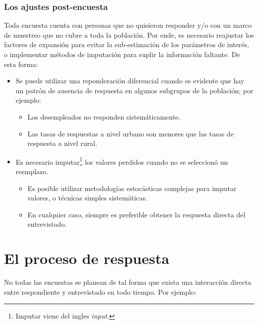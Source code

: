 \documentclass[
  10pt,
  spanish,
]{book}
\providecommand{\tightlist}{%
  \setlength{\itemsep}{0pt}\setlength{\parskip}{0pt}}
\begin{document}
\hypertarget{los-ajustes-post-encuesta}{%
\subsubsection*{Los ajustes post-encuesta}\label{los-ajustes-post-encuesta}}

Toda encuesta cuenta con personas que no quisieron responder y/o con un marco de muestreo que no cubre a toda la población. Por ende, es necesario reajustar los factores de expansión para evitar la sub-estimación de los parámetros de interés, o implementar métodos de imputación para suplir la información faltante. De esta forma:

\begin{itemize}
\tightlist
\item
  Se puede utilizar una reponderación diferencial cuando es evidente que hay un patrón de ausencia de respuesta en algunos subgrupos de la población; por ejemplo:

  \begin{itemize}
  \tightlist
  \item
    Los desempleados no responden sistemáticamente.
  \item
    Las tasas de respuestas a nivel urbano son menores que las tasas de respuesta a nivel rural.
  \end{itemize}
\item
  Es necesario imputar\footnote{Imputar viene del ingles \emph{input}.} los valores perdidos cuando no se seleccionó un reemplazo.

  \begin{itemize}
  \tightlist
  \item
    Es posible utilizar metodologías estocásticas complejas para imputar valores, o técnicas simples sistemáticas.
  \item
    En cualquier caso, siempre es preferible obtener la respuesta directa del entrevistado.
  \end{itemize}
\end{itemize}

\hypertarget{el-proceso-de-respuesta}{%
\section{El proceso de respuesta}\label{el-proceso-de-respuesta}}

No todas las encuestas se planean de tal forma que exista una interacción directa entre respondiente y entrevistado en todo tiempo. Por ejemplo:
\end{document}
